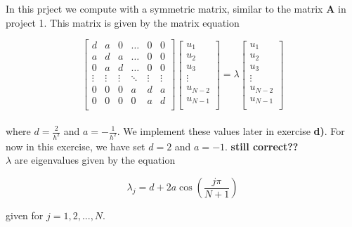 \documentclass{article}
\begin{document}
  In this prject we compute with a symmetric matrix, similar to the matrix \textbf{A} in project 1. This matrix is given by the matrix equation

    \begin{equation*} \label{eq:fullmatrixeq}
      \begin{bmatrix}
        d & a & 0 & \dots & 0 & 0 \\
        a & d & a & \dots & 0 & 0 \\
        0 & a & d & \dots & 0 & 0 \\
        \vdots & \vdots & \vdots & \ddots & \vdots & \vdots \\
        0 & 0 & 0 & a & d & a \\
        0 & 0 & 0 & 0 & a & d \\
      \end{bmatrix}
      \begin{bmatrix}
        u_1 \\
        u_2 \\
        u_3 \\
        \vdots \\
        u_{N-2} \\
        u_{N-1} \\
      \end{bmatrix}
      = \lambda
      \begin{bmatrix}
        u_1 \\
        u_2 \\
        u_3 \\
        \vdots \\
        u_{N-2} \\
        u_{N-1} \\
      \end{bmatrix}
    \end{equation*} \\

where $d = \frac{2}{h^2}$ and $a = - \frac{1}{h^2}$. We implement these values later in exercise \textbf{d)}. For now in this exercise, we have set $d = 2$ and $a = - 1$.
\textbf{still correct??} \\

$\lambda$ are eigenvalues given by the equation

\begin{equation*}
    \lambda_j = d + 2a \cos \left( \frac{j \pi }{N + 1} \right)
\end{equation*}

given for $ j = 1, 2, ..., N$.
\end{document}
